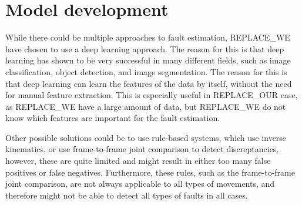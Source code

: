 \chapter{Model development}
\label{sec:model_development}

While there could be multiple approaches to fault estimation, REPLACE_WE have chosen to use a deep learning approach. The reason for this is that deep learning has shown to be very successful in many different fields, such as image classification, object detection, and image segmentation. The reason for this is that deep learning can learn the features of the data by itself, without the need for manual feature extraction. This is especially useful in REPLACE_OUR case, as REPLACE_WE have a large amount of data, but REPLACE_WE do not know which features are important for the fault estimation.

Other possible solutions could be to use rule-based systems, which use inverse kinematics, or use frame-to-frame joint comparison to detect discreptancies, however, these are quite limited and might result in either too many false positives or false negatives. Furthermore, these rules, such as the frame-to-frame joint comparison, are not always applicable to all types of movements, and therefore might not be able to detect all types of faults in all cases.




